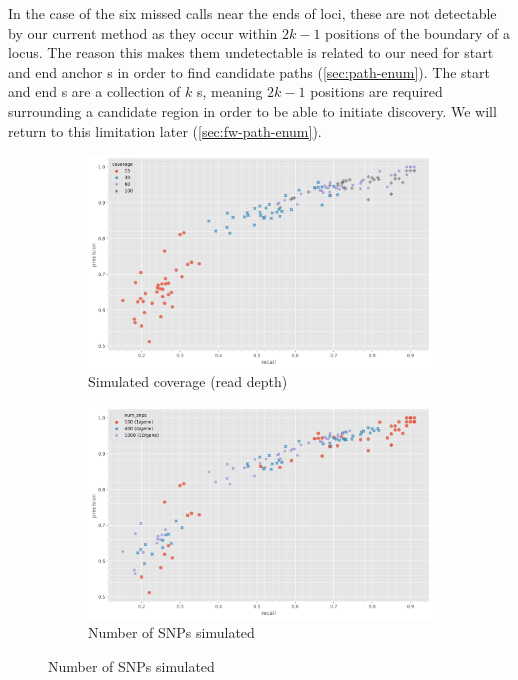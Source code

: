 In the case of the six missed calls near the ends of loci, these are not detectable by our current \denovo{} method as they occur within $2k-1$ positions of the boundary of a locus. The reason this makes them undetectable is related to our need for start and end anchor \kmer{}s in order to find candidate paths (\autoref{sec:path-enum}). The start and end \kmer{}s are a collection of $k$ \kmer{}s, meaning $2k-1$ positions are required surrounding a candidate region in order to be able to initiate \denovo{} discovery. We will return to this limitation later (\autoref{sec:fw-path-enum}).

\begin{figure}
     \centering
     \begin{subfigure}[b]{0.475\textwidth}
        \centering
        \caption[position=above]{Simulated coverage (read depth)}
        \label{fig:denovo-sims-covg}
        \includegraphics[width=1\linewidth]{Chapter1/Figs/denovo_precrec_covg.png}
     \end{subfigure}
     \begin{subfigure}[b]{0.475\textwidth}
         \centering
          \caption[position=above]{Number of SNPs simulated}
         \label{fig:denovo-sims-num-snps}
        \includegraphics[width=1\linewidth]{Chapter1/Figs/denovo_precrec_num_snps.png}

\end{subfigure}
\end{figure}
